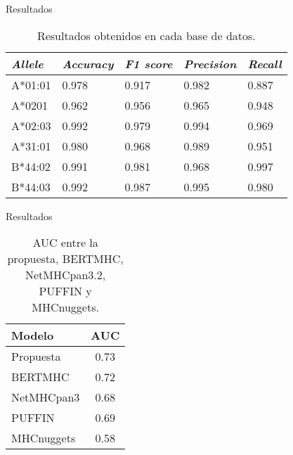 \documentclass[10pt]{beamer}
\newcommand{\1}{
	\setbeamertemplate{background}{
		\texttt{[image: img/1]}
		\tikz[overlay] \fill[fill opacity=0.75,fill=white] (0,0) rectangle (-\paperwidth,\paperheight);
	}
}
\begin{document}
\begin{frame}{Resultados}{}
\begin{table}[]
	\centering
	\caption{Resultados obtenidos en cada base de datos. }
	\label{tab:results}
	\setlength{\tabcolsep}{0.8em} %
	{\renewcommand{\arraystretch}{1.3}%
		\begin{tabular}{lllll}
			\hline
			\textit{\textbf{Allele}} & \textit{\textbf{Accuracy}} & \textit{\textbf{F1 score}} & \textit{\textbf{Precision}} & \textit{\textbf{Recall}} \\
			\hline
			A*01:01                  & 0.978                      & 0.917                      & 0.982                       & 0.887                    \\
			A*0201                   & 0.962                      & 0.956                      & 0.965                       & 0.948                    \\
			A*02:03                  & 0.992                      & 0.979                      & 0.994                       & 0.969                    \\
			A*31:01                  & 0.980                      & 0.968                      & 0.989                       & 0.951                    \\
			B*44:02                  & 0.991                      & 0.981                      & 0.968                       & 0.997                    \\
			B*44:03                  & 0.992                      & 0.987                      & 0.995                       & 0.980                   
		\end{tabular}
	}
\end{table}
\end{frame}

\begin{frame}{Resultados}{}
	\begin{table}[h]
		\centering
		\caption{AUC entre la propuesta, BERTMHC, NetMHCpan3.2, PUFFIN y MHCnuggets.}
		\setlength{\tabcolsep}{0.8em} %
		{\renewcommand{\arraystretch}{1.3}%
			\begin{tabular}{lc}
				\hline
				\textbf{Modelo} & \textbf{AUC} \\ \hline
				Propuesta & 0.73\\
				BERTMHC & 0.72\\
				NetMHCpan3 & 0.68\\
				PUFFIN & 0.69\\
				MHCnuggets & 0.58\\
			\end{tabular}
		}
	\end{table}
\end{frame}
\end{document}
